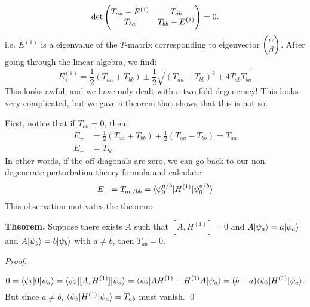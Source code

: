 \begin{equation}
    \det\begin{pmatrix}T_{aa} - E^{(1)} & T_{ab} \\ T_{ba} & T_{bb} - E^{(1)}\end{pmatrix} = 0.
\end{equation}
i.e. $E^{(1)}$ is a eigenvalue of the $T$-matrix corresponding to eigenvector $\begin{pmatrix}\alpha\\\beta\end{pmatrix}$. After going through the linear algebra, we find:
\begin{equation}
    E^{(1)}_\pm = \frac{1}{2}\left(T_{aa} + T_{bb}\right) \pm \frac{1}{2}\sqrt{\left(T_{aa} - T_{bb}\right)^2 + 4T_{ab}T_{ba}}
\end{equation}
This looks awful, and we have only dealt with a two-fold degeneracy! This looks very complicated, but we gave a theorem that shows that this is not so.

First, notice that if $T_{ab} = 0$, then:
\begin{equation}
    \begin{split}
        E_+ &= \frac{1}{2}(T_{aa} + T_{bb}) + \frac{1}{2}(T_{aa} - T_{bb}) = T_{aa}
        \\ E_- &= T_{bb}
    \end{split}
\end{equation}
In other words, if the off-diagonals are zero, we can go back to our non-degenerate perturbation theory formula and calculate:
\begin{equation}
    E_{\pm} = T_{aa/bb} = \langle \psi_0^{a/b} \rvert H^{(1)}\lvert \psi_0^{a/b} \rangle
\end{equation}
This observation motivates the theorem:

\textbf{Theorem.} Suppose there exists $A$ such that $[A, H^{(1)}] = 0$ and $A\lvert \psi_a \rangle = a\lvert \psi_a \rangle$ and $A\lvert \psi_b \rangle = b\lvert \psi_b \rangle$ with $a \neq b$, then $T_{ab} = 0$. 

\emph{Proof.}

\begin{equation}
    0 = \langle \psi_b \rvert0\lvert \psi_a \rangle = \langle \psi_b \rvert[A, H^{(1)}]\lvert \psi_a \rangle = \langle \psi_b \rvert AH^{(1)} - H^{(1)}A\lvert \psi_a \rangle = (b-a)\langle \psi_b \rvert H^{(1)}\lvert \psi_a \rangle.
\end{equation}
But since $a \neq b$, $\langle \psi_b \rvert H^{(1)}\lvert \psi_a \rangle = T_{ab}$ must vanish. \qed

